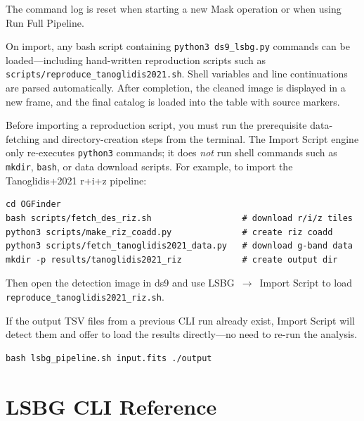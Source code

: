 \documentclass[11pt,fleqn]{book}
\begin{document}
\noindent The command log is reset when starting a new Mask operation or when using Run Full Pipeline.

On import, any bash script containing \texttt{python3 ds9\_lsbg.py} commands can be loaded---including hand-written reproduction scripts such as \texttt{scripts/reproduce\_tanoglidis2021.sh}.  Shell variables and line continuations are parsed automatically.  After completion, the cleaned image is displayed in a new frame, and the final catalog is loaded into the table with source markers.

\begin{important}
Before importing a reproduction script, you must run the prerequisite data-fetching and directory-creation steps from the terminal.  The Import Script engine only re-executes \texttt{python3} commands; it does \emph{not} run shell commands such as \texttt{mkdir}, \texttt{bash}, or data download scripts.  For example, to import the Tanoglidis+2021 r+i+z pipeline:
\begin{codebox}
\begin{lstlisting}[style=bash,numbers=none]
cd OGFinder
bash scripts/fetch_des_riz.sh                  # download r/i/z tiles
python3 scripts/make_riz_coadd.py              # create riz coadd
python3 scripts/fetch_tanoglidis2021_data.py   # download g-band data
mkdir -p results/tanoglidis2021_riz            # create output dir
\end{lstlisting}
\end{codebox}
\noindent Then open the detection image in ds9 and use LSBG~$\to$~Import Script to load \texttt{reproduce\_tanoglidis2021\_riz.sh}.
\end{important}

\begin{important}
If the output TSV files from a previous CLI run already exist, Import Script will detect them and offer to load the results directly---no need to re-run the analysis.
\end{important}

\begin{codebox}
\begin{lstlisting}[style=bash,numbers=none]
bash lsbg_pipeline.sh input.fits ./output
\end{lstlisting}
\end{codebox}


\section{LSBG CLI Reference}
\end{document}
